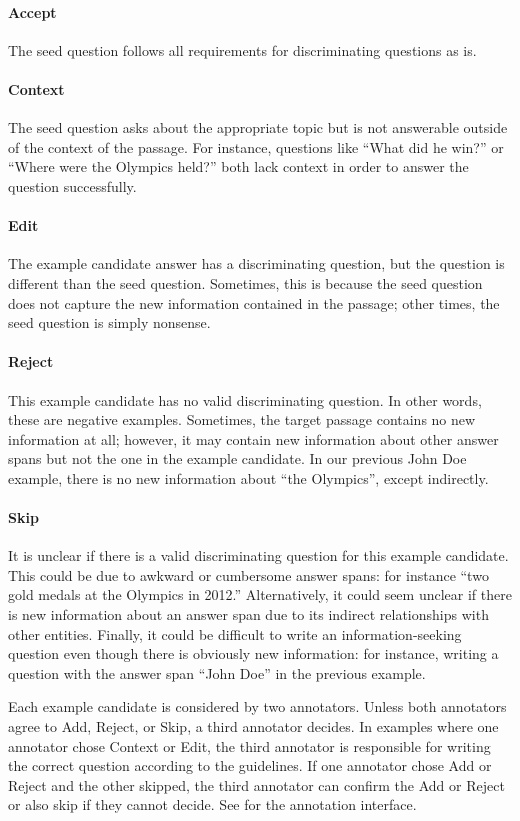 \paragraph{Accept} The seed question follows all requirements for discriminating questions as is.
\paragraph{Context} The seed question asks about the appropriate topic but is not answerable outside of the context of the passage. For instance, questions like ``What did he win?'' or ``Where were the Olympics held?'' both lack context in order to answer the question successfully. 
\paragraph{Edit} The example candidate answer has a discriminating question, but the question is different than the seed question. Sometimes, this is because the seed question does not capture the new information contained in the passage; other times, the seed question is simply nonsense. 
\paragraph{Reject} This example candidate has no valid discriminating question. In other words, these are negative examples. Sometimes, the target passage contains no new information at all; however, it may contain new information about other answer spans but not the one in the example candidate. In our previous John Doe example, there is no new information about ``the Olympics'', except indirectly.
\paragraph{Skip} It is unclear if there is a valid discriminating question for this example candidate. This could be due to awkward or cumbersome answer spans: for instance ``two gold medals at the Olympics in 2012.'' Alternatively, it could seem unclear if there is new information about an answer span due to its indirect relationships with other entities. Finally, it could be difficult to write an information-seeking question even though there is obviously new information: for instance, writing a question with the answer span ``John Doe'' in the previous example. 


Each example candidate is considered by two annotators. Unless both annotators agree to Add, Reject, or Skip, a third annotator decides. In examples where one annotator chose Context or Edit, the third annotator is responsible for writing the correct question according to the guidelines. If one annotator chose Add or Reject and the other skipped, the third annotator can confirm the Add or Reject or also skip if they cannot decide. See  for the annotation interface.

